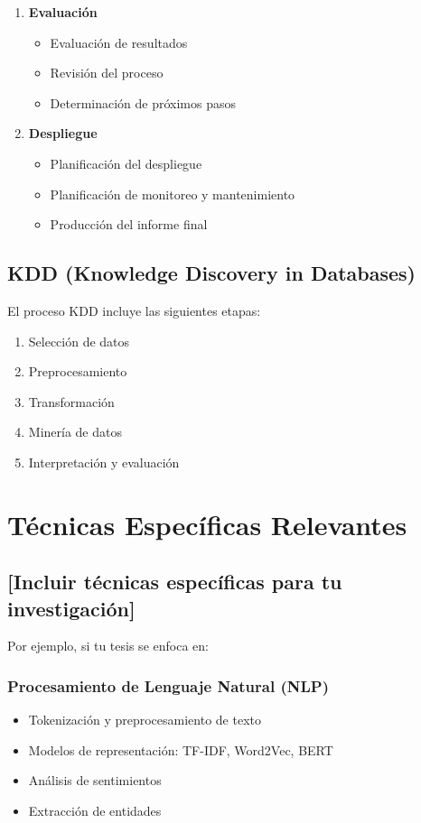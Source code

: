 \begin{enumerate}
    \item \textbf{Evaluación}
        \begin{itemize}
            \item Evaluación de resultados
            \item Revisión del proceso
            \item Determinación de próximos pasos
        \end{itemize}
    
    \item \textbf{Despliegue}
        \begin{itemize}
            \item Planificación del despliegue
            \item Planificación de monitoreo y mantenimiento
            \item Producción del informe final
        \end{itemize}
\end{enumerate}

\subsection{KDD (Knowledge Discovery in Databases)}

El proceso KDD incluye las siguientes etapas:

\begin{enumerate}
    \item Selección de datos
    \item Preprocesamiento
    \item Transformación
    \item Minería de datos
    \item Interpretación y evaluación
\end{enumerate}

\section{Técnicas Específicas Relevantes}

\subsection{[Incluir técnicas específicas para tu investigación]}

Por ejemplo, si tu tesis se enfoca en:

\subsubsection{Procesamiento de Lenguaje Natural (NLP)}
\begin{itemize}
    \item Tokenización y preprocesamiento de texto
    \item Modelos de representación: TF-IDF, Word2Vec, BERT
    \item Análisis de sentimientos
    \item Extracción de entidades
\end{itemize}

